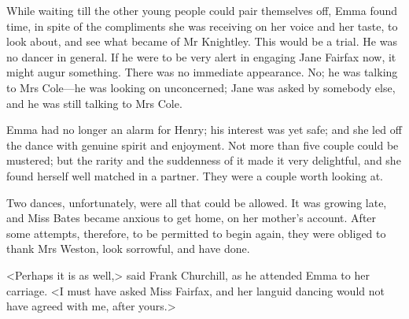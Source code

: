 While waiting till the other young people could pair themselves off, Emma found time, in spite of the compliments she was receiving on her voice and her taste, to look about, and see what became of Mr Knightley. This would be a trial. He was no dancer in general. If he were to be very alert in engaging Jane Fairfax now, it might augur something. There was no immediate appearance. No; he was talking to Mrs Cole—he was looking on unconcerned; Jane was asked by somebody else, and he was still talking to Mrs Cole.

Emma had no longer an alarm for Henry; his interest was yet safe; and she led off the dance with genuine spirit and enjoyment. Not more than five couple could be mustered; but the rarity and the suddenness of it made it very delightful, and she found herself well matched in a partner. They were a couple worth looking at.

Two dances, unfortunately, were all that could be allowed. It was growing late, and Miss Bates became anxious to get home, on her mother's account. After some attempts, therefore, to be permitted to begin again, they were obliged to thank Mrs Weston, look sorrowful, and have done.

<Perhaps it is as well,> said Frank Churchill, as he attended Emma to her carriage. <I must have asked Miss Fairfax, and her languid dancing would not have agreed with me, after yours.>